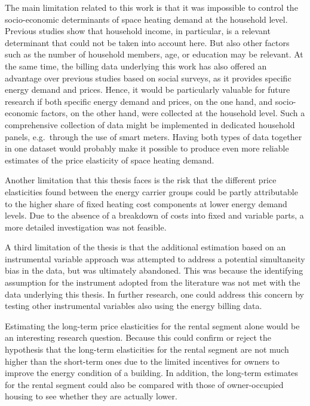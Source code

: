\documentclass[12pt,twoside]{reedthesis}
\begin{document}
The main limitation related to this work is that it was impossible to control the socio-economic determinants of space heating demand at the household level. Previous studies show that household income, in particular, is a relevant determinant that could not be taken into account here. But also other factors such as the number of household members, age, or education may be relevant. At the same time, the billing data underlying this work has also offered an advantage over previous studies based on social surveys, as it provides specific energy demand and prices. Hence, it would be particularly valuable for future research if both specific energy demand and prices, on the one hand, and socio-economic factors, on the other hand, were collected at the household level. Such a comprehensive collection of data might be implemented in dedicated household panels, e.g.~through the use of smart meters. Having both types of data together in one dataset would probably make it possible to produce even more reliable estimates of the price elasticity of space heating demand.

Another limitation that this thesis faces is the risk that the different price elasticities found between the energy carrier groups could be partly attributable to the higher share of fixed heating cost components at lower energy demand levels. Due to the absence of a breakdown of costs into fixed and variable parts, a more detailed investigation was not feasible.

A third limitation of the thesis is that the additional estimation based on an instrumental variable approach was attempted to address a potential simultaneity bias in the data, but was ultimately abandoned. This was because the identifying assumption for the instrument adopted from the literature was not met with the data underlying this thesis. In further research, one could address this concern by testing other instrumental variables also using the energy billing data.

Estimating the long-term price elasticities for the rental segment alone would be an interesting research question. Because this could confirm or reject the hypothesis that the long-term elasticities for the rental segment are not much higher than the short-term ones due to the limited incentives for owners to improve the energy condition of a building. In addition, the long-term estimates for the rental segment could also be compared with those of owner-occupied housing to see whether they are actually lower.
\end{document}
